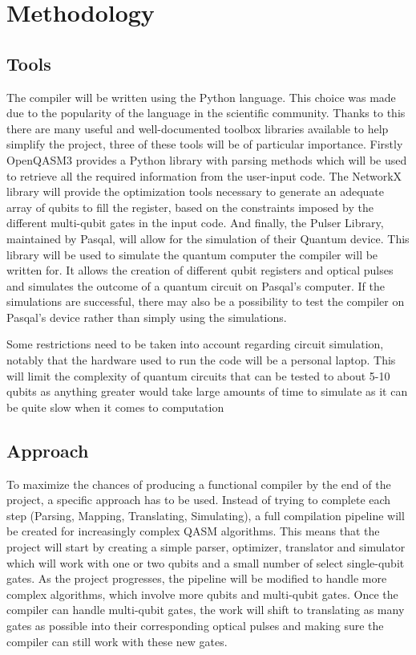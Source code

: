 \section{Methodology}
\label{sec:methods}

\subsection{Tools}
\label{sec:Tools}
The compiler will be written using the Python language. This choice was made due to the popularity of the language in 
the scientific community. Thanks to this there are many useful and well-documented toolbox libraries available to help simplify the project,
three of these tools will be of particular importance.
Firstly OpenQASM3 provides a Python library with parsing methods which will be used to retrieve all the required information from the
user-input code. 
The NetworkX library will provide the optimization tools necessary to generate an adequate array 
of qubits to fill the register, based on the constraints imposed by the different multi-qubit gates in the input code.
And finally, the Pulser Library, maintained by Pasqal, will allow for the simulation of their Quantum device. 
This library will be used to simulate the quantum computer the compiler will be written for. It allows the creation of
different qubit registers and optical pulses and simulates the outcome of a quantum circuit on Pasqal's computer.
If the simulations are successful, there may also be a possibility to test the compiler on Pasqal's device rather than simply using the simulations.

Some restrictions need to be taken into account regarding circuit simulation, notably that the hardware used to run the code will be
 a personal laptop. This will limit the complexity of quantum circuits that can be tested to about 5-10 qubits as anything greater
 would take large amounts of time to simulate as it can be quite slow when it comes to computation %
\subsection{Approach}
\label{sec:Approach}
To maximize the chances of producing a functional compiler by the end of the project, a specific approach has to be used. Instead of
 trying to complete each step (Parsing, Mapping, Translating, Simulating), a full compilation pipeline will be created for increasingly complex 
 QASM algorithms. This means that the project will start by creating a simple parser, optimizer, translator and simulator which will work with
 one or two qubits and a small number of select single-qubit gates. As the project progresses, the pipeline will be modified to handle more complex algorithms, 
 which involve more qubits and multi-qubit gates. Once the compiler can handle multi-qubit gates, the work will shift to translating as many gates as possible 
 into their corresponding optical pulses and making sure the compiler can still work with these new gates.

